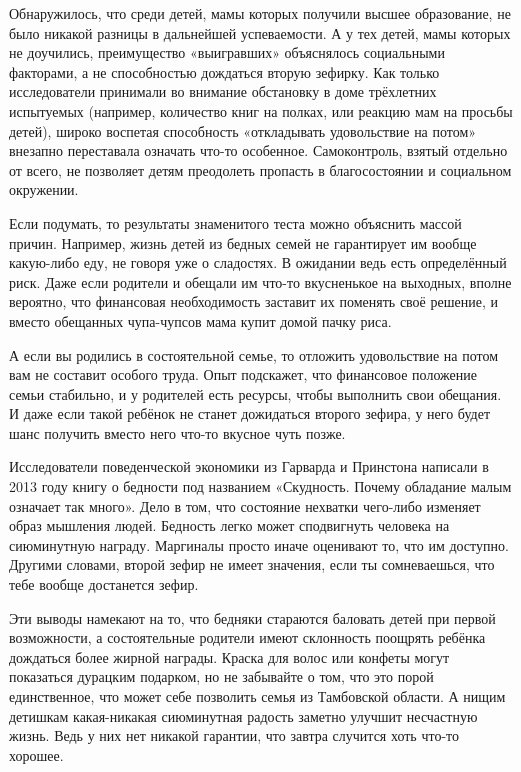 \documentclass[12pt, a4paper, oneside]{article}
\begin{document}
Обнаружилось, что среди детей, мамы которых получили высшее образование, не было никакой разницы в дальнейшей успеваемости. А у тех детей, мамы которых не доучились, преимущество «выигравших» объяснялось социальными факторами, а не способностью дождаться вторую зефирку. Как только исследователи принимали во внимание обстановку в доме трёхлетних испытуемых (например, количество книг на полках, или реакцию мам на просьбы детей), широко воспетая способность «откладывать удовольствие на потом» внезапно переставала означать что-то особенное. Самоконтроль, взятый отдельно от всего, не позволяет детям преодолеть пропасть в благосостоянии и социальном окружении.

Если подумать, то результаты знаменитого теста можно объяснить массой причин. Например, жизнь детей из бедных семей не гарантирует им вообще какую-либо еду, не говоря уже о сладостях. В ожидании ведь есть определённый риск. Даже если родители и обещали им что-то вкусненькое на выходных, вполне вероятно, что финансовая необходимость заставит их поменять своё решение, и вместо обещанных чупа-чупсов мама купит домой пачку риса.

А если вы родились в состоятельной семье, то отложить удовольствие на потом вам не составит особого труда. Опыт подскажет, что финансовое положение семьи стабильно, и у родителей есть ресурсы, чтобы выполнить свои обещания. И даже если такой ребёнок не станет дожидаться второго зефира, у него будет шанс получить вместо него что-то вкусное чуть позже.

Исследователи поведенческой экономики из Гарварда и Принстона написали в 2013 году книгу о бедности под названием «Скудность. Почему обладание малым означает так много». Дело в том, что состояние нехватки чего-либо изменяет образ мышления людей. Бедность легко может сподвигнуть человека на сиюминутную награду. Маргиналы просто иначе оценивают то, что им доступно. Другими словами, второй зефир не имеет значения, если ты сомневаешься, что тебе вообще достанется зефир.

Эти выводы намекают на то, что бедняки стараются баловать детей при первой возможности, а состоятельные родители имеют склонность поощрять ребёнка дождаться более жирной награды. Краска для волос или конфеты могут показаться дурацким подарком, но не забывайте о том, что это порой единственное, что может себе позволить семья из Тамбовской области. А нищим детишкам какая-никакая сиюминутная радость заметно улучшит несчастную жизнь. Ведь у них нет никакой гарантии, что завтра случится хоть что-то хорошее.
\end{document}
